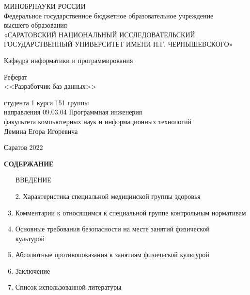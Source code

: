 \thispagestyle{empty}
    \begin{center}
      МИНОБРНАУКИ РОССИИ  \\
      Федеральное государственное бюджетное образовательное учреждение \\
      высшего образования\\
      «САРАТОВСКИЙ НАЦИОНАЛЬНЫЙ ИССЛЕДОВАТЕЛЬСКИЙ ГОСУДАРСТВЕННЫЙ УНИВЕРСИТЕТ ИМЕНИ Н.Г. ЧЕРНЫШЕВСКОГО»
      \vspace*{42pt}
    \end{center}
    \begin{flushright}
      Кафедра информатики и программирования
    \end{flushright}
      \vspace*{42pt}

      \begin{center}
        Реферат\\
       <<Разработчик баз данных>>\\
      \end{center}
          
  \begin{flushleft}
    студента 1 курса 151 группы\\
направления 09.03.04 Программная инженерия\\
факультета компьютерных наук и информационных технологий\\
Демина Егора Игоревича \\

  \end{flushleft}
  \vspace*{336pt}

  \centering
  Саратов 2022

  \newpage
  \thispagestyle{empty}
  
  \begin{center}
  \textbf{СОДЕРЖАНИЕ}
  \end{center}
  \begin{flushleft}
  \begin{enumerate} 
    \item[] ВВЕДЕНИЕ\dotfill
    \item[2.] Характеристика специальной медицинской группы здоровья\dotfill
    \item Комментарии к относящимся к специальной группе контрольным нормативам\dotfill
    \item Основные требования безопасности на месте занятий физической\\ культурой \dotfill
    \item Абсолютные противопоказания к занятиям физической культурой\dotfill 
    \item Заключение\dotfill
    \item Список использованной литературы\dotfill
  \end{enumerate}
  \newpage
  \end{flushleft}
  